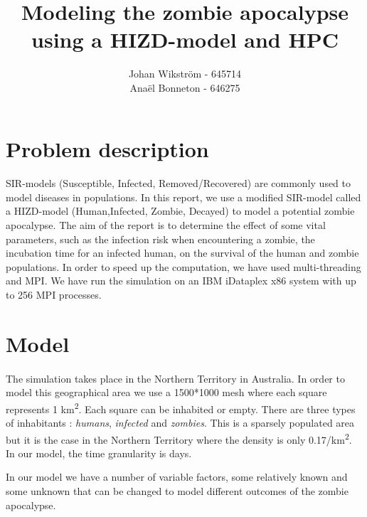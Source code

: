 \documentclass{report}
\begin{document}
\title{Modeling the zombie apocalypse using a HIZD-model and HPC}
\author{Johan Wikström - 645714 \\
        Anaël Bonneton - 646275}
\maketitle
\tableofcontents

\section{Problem description}	

\paragraph{}
SIR-models (Susceptible, Infected, Removed/Recovered) are commonly used to model diseases in populations. In this report, we use a modified SIR-model called a HIZD-model (Human,Infected, Zombie, Decayed) to model a potential zombie apocalypse. The aim of the report is to determine the effect of some vital parameters, such as the infection risk when encountering a zombie, the incubation time for an infected human, on the survival of the human and zombie populations. In order to speed up the computation, we have used multi-threading and MPI\cite{openmpi}. We have run the simulation on an IBM iDataplex x86 system with up to 256 MPI processes.

\section{Model}

\paragraph{}
The simulation takes place in the Northern Territory in Australia. In order to model this geographical area we use a 1500*1000 mesh where each square represents 1 km\textsuperscript{2}. Each square can be inhabited or empty. There are three types of inhabitants : \emph{humans}, \emph{infected} and \emph{zombies}. This is a sparsely populated area but it is the case in the Northern Territory where the density is only 0.17/km\textsuperscript{2}. In our model, the time granularity is days. 

In our model we have a number of variable factors, some relatively known and some unknown that can be changed to model different outcomes of the zombie apocalypse.
\end{document}
